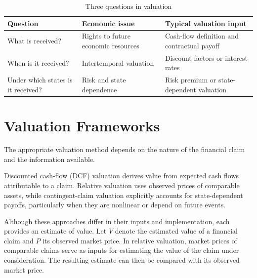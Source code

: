 \begin{table}[H]

\centering

\caption{Three questions in valuation}
\label{tab:ch5-three-valuation-questions}

\begin{tabularx}{\textwidth}{
  @{}
  >{\raggedright\arraybackslash{}}p{3.3cm}
  Y
  Y
  @{}
}

\toprule

\textbf{Question}
& \textbf{Economic issue}
& \textbf{Typical valuation input} \\

\midrule

What is received?
& Rights to future economic resources
& Cash-flow definition and contractual payoff \\[20pt]

When is it received?
& Intertemporal valuation
& Discount factors or interest rates \\[20pt]

Under which states is it received?
& Risk and state dependence
& Risk premium or state-dependent valuation \\

\bottomrule

\end{tabularx}

\end{table}


\section{Valuation Frameworks}

The appropriate valuation method depends on the nature of the financial claim and the information available.

Discounted cash-flow (DCF) valuation derives value from expected cash flows attributable to a claim. Relative valuation uses observed prices of comparable assets, while contingent-claim valuation explicitly accounts for state-dependent payoffs, particularly when they are nonlinear or depend on future events.

Although these approaches differ in their inputs and implementation, each provides an estimate of value. Let $V$ denote the estimated value of a financial claim and $P$ its observed market price. In relative valuation, market prices of comparable claims serve as inputs for estimating the value of the claim under consideration. The resulting estimate can then be compared with its observed market price.

